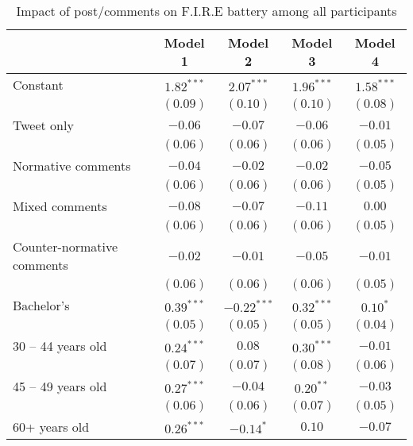 
\begin{table}[h!]
\caption{Impact of post/comments on F.I.R.E battery among all participants}
\begin{center}
\begin{scriptsize}
\begin{tabular}{l c c c c}
\toprule
 & Model 1 & Model 2 & Model 3 & Model 4 \\
\midrule
Constant                   & $1.82^{***}$  & $2.07^{***}$  & $1.96^{***}$  & $1.58^{***}$ \\
                           & $(0.09)$      & $(0.10)$      & $(0.10)$      & $(0.08)$     \\
Tweet only                 & $-0.06$       & $-0.07$       & $-0.06$       & $-0.01$      \\
                           & $(0.06)$      & $(0.06)$      & $(0.06)$      & $(0.05)$     \\
Normative comments         & $-0.04$       & $-0.02$       & $-0.02$       & $-0.05$      \\
                           & $(0.06)$      & $(0.06)$      & $(0.06)$      & $(0.05)$     \\
Mixed comments             & $-0.08$       & $-0.07$       & $-0.11$       & $0.00$       \\
                           & $(0.06)$      & $(0.06)$      & $(0.06)$      & $(0.05)$     \\
Counter-normative comments & $-0.02$       & $-0.01$       & $-0.05$       & $-0.01$      \\
                           & $(0.06)$      & $(0.06)$      & $(0.06)$      & $(0.05)$     \\
Bachelor's                 & $0.39^{***}$  & $-0.22^{***}$ & $0.32^{***}$  & $0.10^{*}$   \\
                           & $(0.05)$      & $(0.05)$      & $(0.05)$      & $(0.04)$     \\
30 -- 44 years old         & $0.24^{***}$  & $0.08$        & $0.30^{***}$  & $-0.01$      \\
                           & $(0.07)$      & $(0.07)$      & $(0.08)$      & $(0.06)$     \\
45 -- 49 years old         & $0.27^{***}$  & $-0.04$       & $0.20^{**}$   & $-0.03$      \\
                           & $(0.06)$      & $(0.06)$      & $(0.07)$      & $(0.05)$     \\
60+ years old              & $0.26^{***}$  & $-0.14^{*}$   & $0.10$        & $-0.07$      \\

\end{tabular}
\end{scriptsize}
\end{center}
\end{table}
